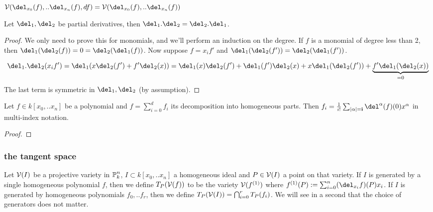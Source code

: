 \begin{corollary}
$\V(\del_{x_0}(f),..\del_{x_n}(f), df) = \V(\del_{x_0}(f),..\del_{x_n}(f))$
\end{corollary}


\begin{lemma}
Let $\del_1,\del_2$ be partial derivatives, then $\del_1.\del_2 = \del_2.\del_1$.
\end{lemma}
\begin{proof}
We only need to prove this for monomials, and we'll perform an induction on the degree.
If $f$ is a monomial of degree less than 2, then $\del_1(\del_2(f)) = 0 = \del_2(\del_1(f))$. 
Now suppose $f = x_if'$ and $\del_1(\del_2(f')) = \del_2(\del_1(f'))$.

\begin{equation}
\del_1.\del_2(x_if') = \del_1(x\del_2(f') + f'\del_2(x)) = 
\del_1(x)\del_2(f') + \del_1(f')\del_2(x) + x\del_1(\del_2(f')) + \underset{=0}{\underbrace{f'\del_1(\del_2(x))}}
\end{equation}
The last term is symmetric in $\del_1,\del_2$ (by assumption).
\end{proof}

\begin{corollary}
Let $f \in k[x_0,..x_n]$ be a polynomial and $f = \sum_{i=0}^d f_i$ its decomposition into homogeneous parts.
Then $f_i = \frac{1}{i!} \sum_{|\bf{\alpha}|=i} \del^{\bf{\alpha}}(f)(0)x^{\bf{\alpha}}$ in multi-index notation.
\end{corollary}
\begin{proof}
\end{proof}


\subsubsection{the tangent space}

\begin{definition} \label{definitionTangentSpace}
Let $\operatorname{\mathcal V}(I)$ be a projective variety in $\operatorname{\mathbb P}^n_k$, $I \subset k[x_0,..x_n]$ a homogeneous ideal and $P\in \operatorname{\mathcal V}(I)$ a point on that variety.
If $I$ is generated by a single homogeneous polynomial $f$, then we define $T_P(\operatorname{\mathcal V}(f))$ to be the variety $\operatorname{\mathcal V}(f^{(1)})$ where $f^{(1)}(P) := \sum_{i=0}^n (\del_{x_i}f)(P)x_i$.
If $I$ is generated by homogeneous polynomials $f_0,..f_r$, then we define $T_P(\operatorname{\mathcal V}(I)) = \bigcap_{i=0}^r T_P(f_i)$.
We will see in a second that the choice of generators does not matter.
\end{definition}

